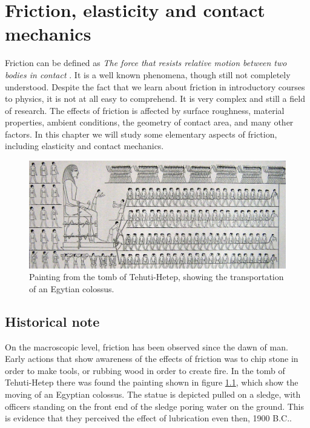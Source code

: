 \documentclass[twoside,english]{uiofysmaster}
\begin{document}
\chapter{Friction, elasticity and contact mechanics}
Friction can be defined as \textit{The force that resists relative motion between two bodies in contact} \cite{frictionDefinition}. 
It is a well known phenomena, though still not completely understood.
Despite the fact that we learn about friction in introductory courses to physics, it is not at all easy to comprehend. 
It is very complex and still a field of research.
The effects of friction is affected by surface roughness, material properties, ambient conditions, the geometry of contact area, and many other factors. 
In this chapter we will study some elementary aspects of friction, including elasticity and contact mechanics.   
 
\begin{figure}[H]
	\centering
	\includegraphics[width=0.99\linewidth]{figures/friction/Colossus.jpg}
	\caption{Painting from the tomb of Tehuti-Hetep, showing the transportation of an Egytian colossus.}
	\label{fig:Colossus}
\end{figure}
\section{Historical note}
On the macroscopic level, friction has been observed since the dawn of man. 
Early actions that show awareness of the effects of friction was to chip stone in order to make tools, or rubbing wood in order to create fire. 
In the tomb of Tehuti-Hetep there was found the painting shown in figure \ref{fig:Colossus}, which show the moving of an Egyptian colossus. 
The statue is depicted pulled on a sledge, with officers standing on the front end of the sledge poring water on the ground. 
This is evidence that they perceived the effect of lubrication even then, 1900 B.C..   
\end{document}
